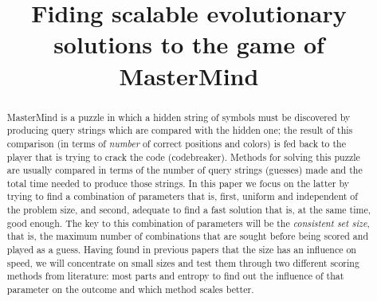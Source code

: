 \documentclass[conference]{IEEEtran}
\begin{document}
%
\title{Fiding scalable evolutionary solutions to the game of MasterMind}

\author{
\and
{}
\and
{}
}

\maketitle

\begin{abstract}
MasterMind is a puzzle in which a hidden string of symbols must be
discovered by producing query strings which are compared with the
hidden one; the result of this comparison (in terms of {\em number}
of correct positions and colors) is fed back to the
player that is trying to crack the code (codebreaker).
Methods for solving this puzzle 
are usually compared in terms of the number of query strings (guesses) made and the total time needed to produce those strings. In this paper we focus on the latter by trying 
to find a combination of parameters that is, first, uniform and
independent of the problem size, and second, adequate to find a fast
solution that is, at the same time, good enough. The key to this combination of parameters
will be the {\em consistent set size}, that is, the maximum number of
combinations that are sought before being scored and played as a
guess. Having found in previous papers that the size has an influence
on speed, we will concentrate on small sizes and test them through two
different scoring methods from literature: most parts and entropy
to find out the influence of that parameter on the outcome and which
method scales better. 
\end{abstract}
\end{document}
